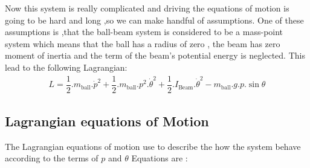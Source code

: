 Now this system is really complicated and driving the equations of motion is going to be hard and long ,so we can make handful of assumptions.
One of these assumptions is ,that the ball-beam system is considered to be a mass-point system which means that the ball has a radius of zero , the beam has zero moment of inertia and the term of the
beam's potential energy is neglected.
This lead to the following Lagrangian:
\begin{equation}
	\begin{split}
		L = \dfrac{1}{2}.m_{\text{ball}}.\dot{p}^2 + \dfrac{1}{2}.m_{\text{ball}}.p^2.\dot{\theta}^2 + \dfrac{1}{2}.I_{\text{Beam}}.\dot{\theta}^2 - m_{\text{ball}}.g.p.\sin{\theta}
	\end{split}
\end{equation}

\newpage
\subsection{Lagrangian equations of Motion}
The Lagrangian equations of motion use to describe the how the system behave according to the terms of $p$ and $\theta$
Equations are :

